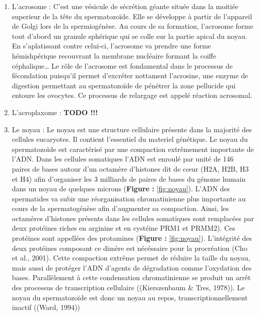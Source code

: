 \documentclass[12pt,twoside]{reedthesis}
\providecommand{\tightlist}{%
  \setlength{\itemsep}{0pt}\setlength{\parskip}{0pt}}
\theoremstyle{definition}
\theoremstyle{definition}
\theoremstyle{remark}
\begin{document}
  \begin{enumerate}
  \def\labelenumi{\arabic{enumi}.}
  \tightlist
  \item
    L'acrosome : C'est une vésicule de sécrétion géante située dans la
    moitiée superieur de la tête du spermatozoïde. Elle se développe à
    partir de l'appareil de Golgi lors de la spermiogénèse. Au cours de sa
    formation, l'acrosome forme tout d'abord un granule sphérique qui se
    colle sur la partie apical du noyau. En s'aplatissant contre celui-ci,
    l'acrosome va prendre une forme hémishpérique recouvrant la membrane
    nucléaire formant la coiffe céphalique\ldots{} Le rôle de l'acrosome
    est fondamental dans le processus de fécondation puisqu'il permet
    d'excréter nottament l'acrosine, une enzyme de digestion permettant au
    spermatozoïde de pénétrer la zone pellucide qui entoure les ovocytes.
    Ce processus de relargage est appelé réaction acrosomal.\\
  \item
    L'acroplaxome : \textbf{TODO !!!}\\
  \item
    Le noyau : Le noyau est une structure cellulaire présente dans la
    majorité des cellules eucaryotes. Il contient l'essentiel du materiel
    génétique. Le noyau du spermatozoïde est caractérisé par une
    compaction extrêmement importante de l'ADN. Dans les cellules
    somatiques l'ADN est enroulé par unité de 146 paires de bases autour
    d'un octamère d'histones dit de cœur (H2A, H2B, H3 et H4) afin
    d'organiser les 3 milliards de paires de bases du génome humain dans
    un noyau de quelques microns (\textbf{Figure : }\ref{fig:noyau}).
    L'ADN des spermatides va subir une réorganisation chromatinienne plus
    importante au cours de la spermatogénèse afin d'augmenter sa
    compaction. Ainsi, les octamères d'histones présents dans les cellules
    somatiques sont remplacées par deux protéines riches en arginine et en
    cystéine PRM1 et PRMM2). Ces protéines sont appellées des protamines
    (\textbf{Figure : }\ref{fig:noyau}). L'intégrité des deux protéines
    composant ce dimère est nécéssaire pour la procréation (Cho et al.,
    2001). Cette compaction extrême permet de réduire la taille du noyau,
    mais aussi de protéger l'ADN d'agents de dégradation comme l'oxydation
    des bases. Parallèlement à cette condensation chromatinienne se
    produit un arrêt des processus de transcription cellulaire
    ((Kierszenbaum \& Tres, 1978)). Le noyau du spermatozoïde est donc un
    noyau au repos, transcriptionnellement inactif ((Ward, 1994))
  \end{enumerate}
  
\end{document}
